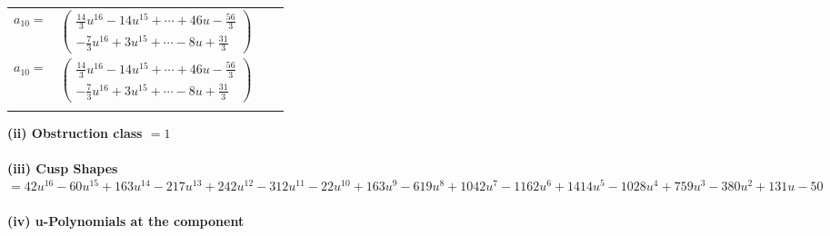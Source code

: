 \documentclass[1p]{elsarticle_modified}
\theoremstyle{definition}
\begin{document}
\begin{tabular}{m{7pt} m{180pt} m{7pt} m{180pt} }
\flushright $a_{10}=$&$\begin{pmatrix}\frac{14}{3} u^{16}-14 u^{15}+\cdots+46 u-\frac{56}{3}\\-\frac{7}{3} u^{16}+3 u^{15}+\cdots-8 u+\frac{31}{3}\end{pmatrix}$\\ \flushright $a_{10}=$&$\begin{pmatrix}\frac{14}{3} u^{16}-14 u^{15}+\cdots+46 u-\frac{56}{3}\\-\frac{7}{3} u^{16}+3 u^{15}+\cdots-8 u+\frac{31}{3}\end{pmatrix}$\\&\end{tabular}
\flushleft \textbf{(ii) Obstruction class $= 1$}\\~\\
\flushleft \textbf{(iii) Cusp Shapes $= 42 u^{16}-60 u^{15}+163 u^{14}-217 u^{13}+242 u^{12}-312 u^{11}-22 u^{10}+163 u^9-619 u^8+1042 u^7-1162 u^6+1414 u^5-1028 u^4+759 u^3-380 u^2+131 u-50$}\\~\\
\newpage\renewcommand{\arraystretch}{1}
\flushleft \textbf{(iv) u-Polynomials at the component}\newline \\
\end{document}
